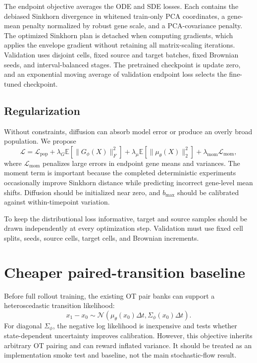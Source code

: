\documentclass[11pt]{article}
\newcommand{\E}{\mathbb{E}}
\newcommand{\N}{\mathcal{N}}
\begin{document}
The endpoint objective averages the ODE and SDE losses. Each contains the
debiased Sinkhorn divergence in whitened train-only PCA coordinates, a
gene-mean penalty normalized by robust gene scale, and a PCA-covariance
penalty. The optimized Sinkhorn plan is detached when computing gradients,
which applies the envelope gradient without retaining all matrix-scaling
iterations. Validation uses disjoint cells, fixed source and target batches,
fixed Brownian seeds, and interval-balanced stages. The pretrained checkpoint
is update zero, and an exponential moving average of validation endpoint loss
selects the fine-tuned checkpoint.

\subsection{Regularization}

Without constraints, diffusion can absorb model error or produce an overly
broad population. We propose
\begin{equation}
  \mathcal L
  = \mathcal L_{\mathrm{pop}}
  + \lambda_G\E\left[\lVert G_\phi(X)\rVert_F^2\right]
  + \lambda_\mu\E\left[\lVert \mu_\theta(X)\rVert_2^2\right]
  + \lambda_{\mathrm{mom}}\mathcal L_{\mathrm{mom}},
  \label{eq:full-loss}
\end{equation}
where $\mathcal L_{\mathrm{mom}}$ penalizes large errors in endpoint gene means
and variances. The moment term is important because the completed deterministic
experiments occasionally improve Sinkhorn distance while predicting incorrect
gene-level mean shifts. Diffusion should be initialized near zero, and
$b_{\max}$ should be calibrated against within-timepoint variation.

To keep the distributional loss informative, target and source samples should
be drawn independently at every optimization step. Validation must use fixed
cell splits, seeds, source cells, target cells, and Brownian increments.

\section{Cheaper paired-transition baseline}

Before full rollout training, the existing OT pair banks can support a
heteroscedastic transition likelihood:
\begin{equation}
  x_1-x_0
  \sim
  \N\!\left(
    \mu_\theta(x_0)\Delta t,
    \Sigma_\phi(x_0)\Delta t
  \right).
  \label{eq:nll}
\end{equation}
For diagonal $\Sigma_\phi$, the negative log likelihood is inexpensive and
tests whether state-dependent uncertainty improves calibration. However, this
objective inherits arbitrary OT pairing and can reward inflated variance. It
should be treated as an implementation smoke test and baseline, not the main
stochastic-flow result.
\end{document}
